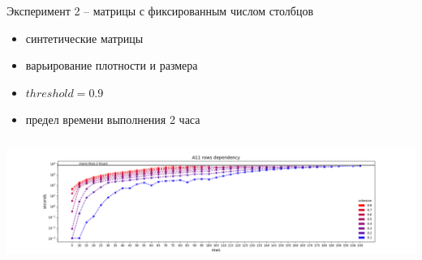 \documentclass[10pt, dvipsnames]{beamer}
\begin{document}
\begin{frame}{Эксперимент 2 -- матрицы с фиксированным числом столбцов}

	\begin{itemize}
	\item синтетические матрицы
	\item варьирование плотности и размера
	\item $threshold = 0.9$
	\item предел времени выполнения 2 часа
	\end{itemize}
\vspace*{+0.5cm}\hspace*{-1.5cm}\includegraphics[width=14cm, height=4cm]{./images/A11-X-20.png}
\end{frame}
\end{document}
